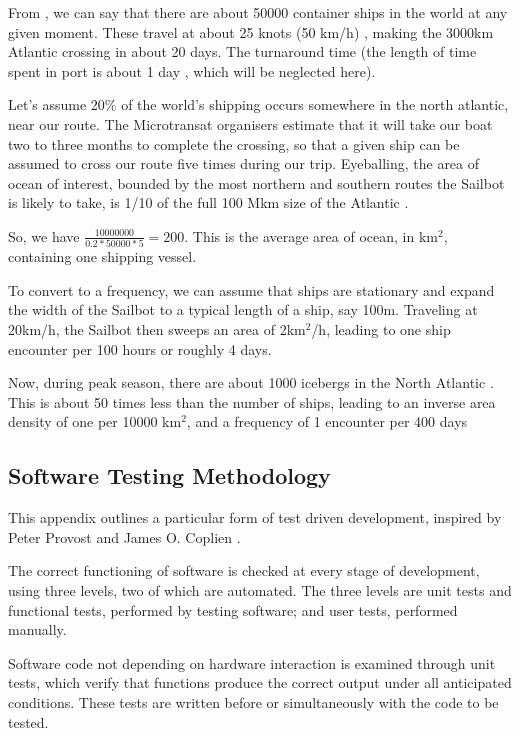 From \cite{jallal__how-many-ships}, we can say that there are about 50000 container ships in the world at any given moment. These travel at about 25 knots (50 km/h) \cite{maersk__triple-e-class}, making the 3000km Atlantic crossing in about 20 days. The turnaround time (the length of time spent in port is about 1 day \cite{port-technology__global-turnaround-times}, which will be neglected here).

Let's assume 20\% of the world's shipping occurs somewhere in the north atlantic, near our route. The Microtransat organisers estimate that it will take our boat two to three months to complete the crossing, so that a given ship can be assumed to cross our route five times during our trip. Eyeballing, the area of ocean of interest, bounded by the most northern and southern routes the Sailbot is likely to take, is 1/10 of the full 100 Mkm size of the Atlantic \cite{worldatlas__atlantic-ocean}.

So, we have $\frac{10000000}{0.2*50000*5}=200$. This is the average area of ocean, in km$^2$, containing one shipping vessel.

To convert to a frequency, we can assume that ships are stationary and expand the width of the Sailbot to a typical length of a ship, say 100m. Traveling at 20km/h, the Sailbot then sweeps an area of 2km$^2$/h, leading to one ship encounter per 100 hours or roughly 4 days.

Now, during peak season, there are about 1000 icebergs in the North Atlantic \cite{natgeo__iceberg-frequency}. This is about 50 times less than the number of ships, leading to an inverse area density of one per 10000 km$^2$, and a frequency of 1 encounter per 400 days


\clearpage
\newpage
\subsection{\label{app:software-testing-methodology}Software Testing Methodology}
This appendix outlines a particular form of test driven development, inspired by Peter Provost \cite{provost-tdd} and James O. Coplien \cite{coplien-tdd-waste}.

The correct functioning of software is checked at every stage of development, using three levels, two of which are automated. The three levels are unit tests and functional tests, performed by testing software; and user tests, performed manually.

Software code not depending on hardware interaction is examined through unit tests, which verify that functions produce the correct output under all anticipated conditions. These tests are written before or simultaneously with the code to be tested.

